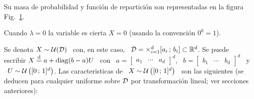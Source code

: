 Su masa  de probabilidad  y funci\'on de  repartici\'on son representadas  en la
figura Fig.~\ref{Fig:MP:Poisson}.
%
\begin{figure}[h!]
\begin{center}  \end{center}
%
\label{Fig:MP:Poisson}
\end{figure}

Cuando $\lambda =  0$ la variable es cierta  $X = 0$ (usando la convenci\'on $0^0 = 1$).





\label{Ssec:MP:EjemplosDistribucionescontinuas}




Se denota $X \sim \mathcal{U}(\mathcal{D})$ \ con,  en este caso, \ $\mathcal{D} = \operatorname*{\times}_{i=1}^d [a_i \,
; \, b_i] \subset \mathbb{R}^d$. Se puede escribir  $X \stackrel{\mathrm{d}}{=} a + \operatorname{diag}(b-a) U$ \ con
\  $a  =   \begin{bmatrix}  a_1  &  \cdots  &  a_d   \end{bmatrix}^d$,  \  $b  =
\begin{bmatrix} b_1 & \cdots & b_d \end{bmatrix}^d$  \ y \ $U \sim \mathcal{U} \left( [ 0
\, ; \, 1 ]^d \right)$. Las caracteristicas de \ $X \sim \mathcal{U} \left( [ 0 \, ; \, 1
]^d \right)$ \ son las siguientes (se deducen para cualquier uniforme sobre $\mathcal{D}$
por transformaci\'on lineal; ver secciones anteriores):

